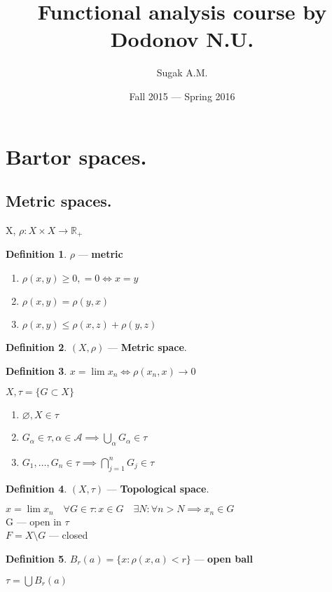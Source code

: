 \documentclass[12pt, fleqn]{article}
\author{Sugak A.M.}
\title{Functional analysis course by Dodonov N.U.}
\date{Fall 2015 --- Spring 2016}
\theoremstyle{definition}
\newtheorem*{defn}{Definition}
\theoremstyle{break}
\theoremstyle{theorem}
\begin{document}
\maketitle
\newpage
\section{Bartor spaces.}
\subsection{Metric spaces.}

X, $\rho\colon X \times X \to \mathbb{R}_+$
\begin{defn}$\rho$ --- \textbf{metric}\end{defn}
  \begin{enumerate} 
    \item $\rho(x, y) \geq 0, = 0 \iff x = y$
    \item $\rho(x, y) = \rho (y, x)$
    \item $\rho(x, y) \leq \rho (x, z) + \rho (y, z)$
  \end{enumerate}
\begin{defn}$(X, \rho)$ --- \textbf{Metric space}.\end{defn}
\begin{defn}$x = \lim x_{n} \iff \rho(x_{n}, x) \rightarrow 0$\end{defn}
\vspace{5mm}
$X, \tau = \{G \subset X\}$
\begin{enumerate}
  \item $\varnothing, X \in \tau$
  \item $G_\alpha \in \tau, \alpha \in \mathcal{A} \implies \bigcup\limits_\alpha G_\alpha \in \tau$
  \item $G_1, \dotsc, G_n \in \tau \implies \bigcap\limits_{j = 1}^n G_j \in \tau$
\end{enumerate}
\begin{defn}$(X, \tau)$ --- \textbf{Topological space}.\end{defn}
$x = \lim x_n \quad \forall G \in \tau: x \in G \quad \exists N: \forall n > N \implies x_n \in G$
\\G --- open in $\tau$
\\$F = X \setminus G$ --- closed
\begin{defn}
  $B_r (a) = \{x: \rho(x, a) < r\}$ --- \textbf{open ball}
\end{defn}
\noindent
$\tau = \bigcup B_r (a)$
\vspace{5mm}
\end{document}

